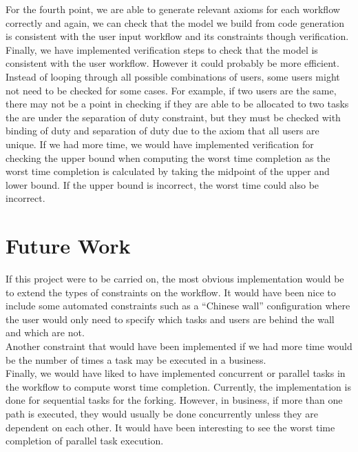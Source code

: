 \documentclass[a4paper]{report}
\begin{document}
For the fourth point, we are able to generate relevant axioms for each workflow correctly and again, we can check that the model we build from code generation is consistent with the user input workflow and its constraints though verification.\\

Finally, we have implemented verification steps to check that the model is consistent with the user workflow. However it could probably be more efficient. Instead of looping through all possible combinations of users, some users might not need to be checked for some cases. For example, if two users are the same, there may not be a point in checking if they are able to be allocated to two tasks the are under the separation of duty constraint, but they must be checked with binding of duty and separation of duty due to the axiom that all users are unique. If we had more time, we would have implemented verification for checking the upper bound when computing the worst time completion as the worst time completion is calculated by taking the midpoint of the upper and lower bound. If the upper bound is incorrect, the worst time could also be incorrect. 

\section{Future Work}
If this project were to be carried on, the most obvious implementation would be to extend the types of constraints on the workflow. It would have been nice to include some automated constraints such as a ``Chinese wall'' configuration where the user would only need to specify which tasks and users are behind the wall and which are not. \\

Another constraint that would have been implemented if we had more time would be the number of times a task may be executed in a business. \\

Finally, we would have liked to have implemented concurrent or parallel tasks in the workflow to compute worst time completion. Currently, the implementation is done for sequential tasks for the forking. However, in business, if more than one path is executed, they would usually be done concurrently unless they are dependent on each other. It would have been interesting to see the worst time completion of parallel task execution. \\
\end{document}
